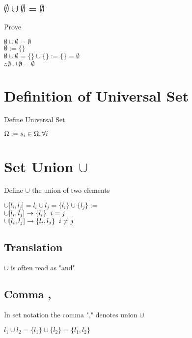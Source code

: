 \documentclass[11pt]{article}
\begin{document}
\subsection{$\emptyset \cup \emptyset = \emptyset$}
Prove
\begin{center}
$
\emptyset \cup \emptyset = \emptyset
$
\\ \vspace{6mm}
$
\emptyset := \{\}
$
\\ \vspace{2mm}
$
\emptyset \cup \emptyset = \{\} \cup \{\} := \{\} = \emptyset
$
\\ \vspace{2mm}
$
\therefore \emptyset \cup \emptyset = \emptyset
$
\end{center}






\section{Definition of Universal Set}
Define Universal Set
\begin{center}
$
\Omega := s_i \in \Omega, \forall i \hspace{5mm}
$
\end{center}





\section{Set Union $\cup$}
Define $\cup$ the union of two elements
\begin{center}
$\cup \lbrack l_i,l_j\rbrack = l_i \cup l_j = \{l_i\} \cup \{l_j\} :=$
\\ \vspace{2mm}
$\cup \lbrack l_i,l_j\rbrack \rightarrow \{l_i\} \hspace{2mm} i = j$
\\
$\cup \lbrack l_i,l_j\rbrack \rightarrow \{l_i,l_j\} \hspace{2mm} i \neq j$
\end{center}

\subsection{Translation}
$\cup$ is often read as "and"

\subsection{Comma ,}
In set notation the comma "," denotes union $\cup$
\begin{center}
$l_1 \cup l_2 = \{l_1\} \cup \{l_2\} = \{l_1,l_2\}$
\end{center}
\end{document}
